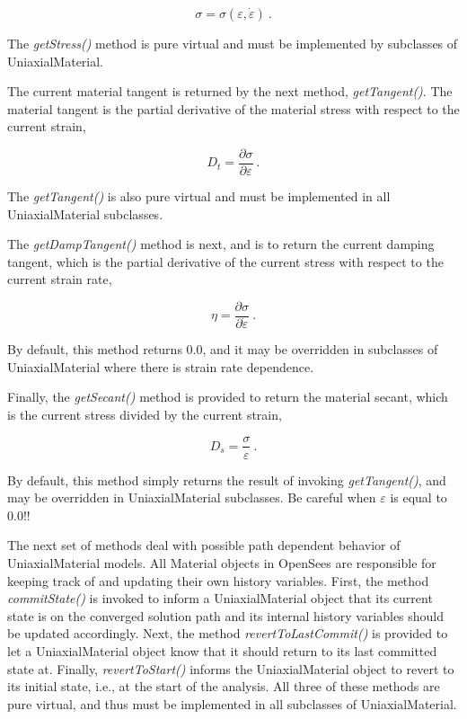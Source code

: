 \documentclass[12pt]{article}
\begin{document}
\begin{equation}
 \sigma = \sigma(\varepsilon,\dot{\varepsilon}) \: .
\end{equation}

\noindent The {\em getStress()} method is pure virtual and must be implemented by subclasses
of UniaxialMaterial.

The current material tangent is returned by the next method, {\em getTangent()}. The material tangent
is the partial derivative of the material stress with respect to the current strain,

\begin{equation}
 D_t = \frac{\partial{\sigma}}{\partial{\varepsilon}} \: .
\end{equation}

\noindent The {\em getTangent()} is also pure virtual and must be implemented in all UniaxialMaterial
subclasses.

The {\em getDampTangent()} method is next, and is to return the current damping tangent, which is
the partial derivative of the current stress with respect to the current strain rate,

\begin{equation}
 \eta = \frac{\partial{\sigma}}{\partial{\dot{\varepsilon}}} \: .
\end{equation}

\noindent By default, this method returns $0.0$, and it may be overridden in subclasses of
UniaxialMaterial where there is strain rate dependence.

Finally, the {\em getSecant()} method is provided to return the material secant, which
is the current stress divided by the current strain,

\begin{equation}
 D_s = \frac{\sigma}{\varepsilon} \: .
\end{equation}

\noindent By default, this method simply returns the result of invoking {\em getTangent()}, and
may be overridden in UniaxialMaterial subclasses. Be careful when $\varepsilon$ is equal to
$0.0$!!

The next set of methods deal with possible path dependent behavior of UniaxialMaterial models.
All Material objects in OpenSees are responsible for keeping track of and updating their
own history variables. First, the method {\em commitState()} is invoked to inform a
UniaxialMaterial object that its current state is on the converged solution path and
its internal history variables should be updated accordingly. Next, the method
{\em revertToLastCommit()} is provided to let a UniaxialMaterial object know that it
should return to its last committed state at. Finally, {\em revertToStart()} informs the
UniaxialMaterial object to revert to its initial state, i.e., at the start of
the analysis. All three of these methods are pure virtual, and thus must be implemented
in all subclasses of UniaxialMaterial.
\end{document}
